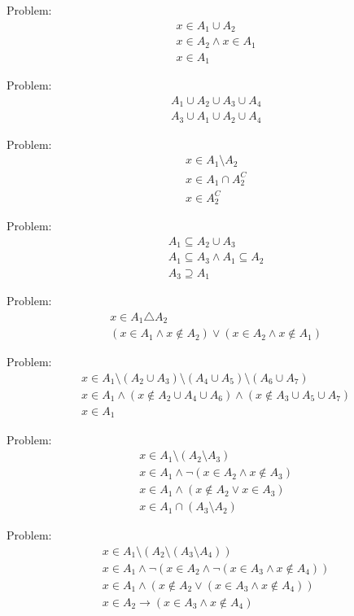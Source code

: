 \documentclass[12pt,letterpaper]{article}
\begin{document}
Problem:
\begin{align}
& x \in A_1 \cup A_2
\\
& x \in A_2 \wedge x \in A_1
\\
& x \in A_1
\end{align}

Problem:
\begin{align}
& A_1 \cup A_2 \cup A_3 \cup A_4
\\
& A_3 \cup A_1 \cup A_2 \cup A_4
\end{align}

Problem:
\begin{align}
& x \in A_1 \setminus A_2
\\
& x \in A_1 \cap A_2 ^C
\\
& x \in A_2 ^C
\end{align}

Problem:
\begin{align}
& A_1 \subseteq A_2 \cup A_3
\\
& A_1 \subseteq A_3 \wedge A_1 \subseteq A_2
\\
& A_3 \supseteq A_1
\end{align}

Problem:
\begin{align}
& x \in A_1 \triangle A_2
\\
& (x \in A_1 \wedge x \notin A_2 ) \vee (x \in A_2 \wedge x \notin A_1 )
\end{align}

Problem:
\begin{align}
& x \in A_1 \setminus ( A_2 \cup A_3 ) \setminus ( A_4 \cup A_5 ) \setminus ( A_6 \cup A_7 )
\\
& x \in A_1 \wedge (x \notin A_2 \cup A_4 \cup A_6 ) \wedge (x \notin A_3 \cup A_5 \cup A_7 )
\\
& x \in A_1
\end{align}

Problem:
\begin{align}
& x \in A_1 \setminus ( A_2 \setminus A_3 )
\\
& x \in A_1 \wedge \neg (x \in A_2 \wedge x \notin A_3 )
\\
& x \in A_1 \wedge (x \notin A_2 \vee x \in A_3 )
\\
& x \in A_1 \cap ( A_3 \setminus A_2 )
\end{align}

Problem:
\begin{align}
& x \in A_1 \setminus ( A_2 \setminus ( A_3 \setminus A_4 ))
\\
& x \in A_1 \wedge \neg(x \in A_2 \wedge\neg(x \in A_3 \wedge x \notin A_4 ))
\\
& x \in A_1 \wedge (x \notin A_2 \vee (x \in A_3 \wedge x \notin A_4 ))
\\
& x \in A_2 \rightarrow (x \in A_3 \wedge x \notin A_4 )
\end{align}
\end{document}
